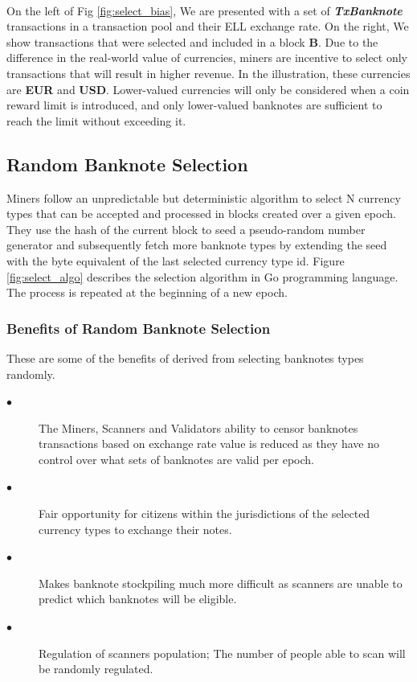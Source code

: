 \paragraph{} On the left of Fig \ref{fig:select_bias}, We are presented with a set of \textbf{\textit{TxBanknote}} transactions in a transaction pool and their ELL exchange rate. On the right, We show transactions that were selected and included in a block \textbf{B}. Due to the difference in the real-world value of currencies, miners are incentive to select only transactions that will result in higher revenue. In the illustration, these currencies are \textbf{EUR} and \textbf{USD}. Lower-valued currencies will only be considered when a coin reward limit is introduced, and only lower-valued banknotes are sufficient to reach the limit without exceeding it. 

\subsection{Random Banknote Selection}
Miners follow an unpredictable but deterministic algorithm to select N currency types that can be accepted and processed in blocks created over a given epoch. They use the hash of the current block to seed a pseudo-random number generator and subsequently fetch more banknote types by extending the seed with the byte equivalent of the last selected currency type id. Figure \ref{fig:select_algo} describes the selection algorithm in Go programming language. 
The process is repeated at the beginning of a new epoch. 

\subsubsection{Benefits of Random Banknote Selection}
These are some of the benefits of derived from selecting banknotes types randomly. 
\vspace{1mm}
\begin{description}
  \item[$\bullet$] The Miners, Scanners and Validators ability to censor banknotes transactions based on exchange rate value is reduced as they have no control over what sets of banknotes are valid per epoch.
  \item[$\bullet$] Fair opportunity for citizens within the jurisdictions of the selected currency types to exchange their notes. 
  \item[$\bullet$] Makes banknote stockpiling much more difficult as scanners are unable to predict which banknotes will be eligible.
  \item[$\bullet$] Regulation of scanners population; The number of people able to scan will be randomly regulated. 
  
\end{description}

